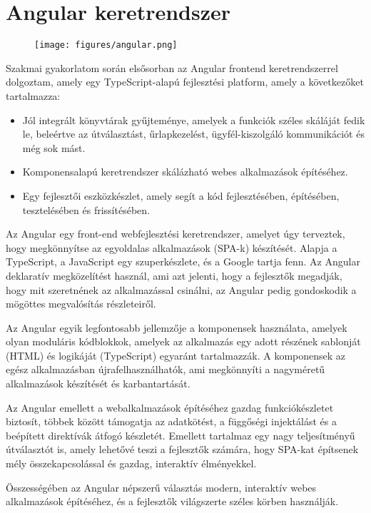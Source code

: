 \section*{Angular keretrendszer}
\begin{figure}[H]
    \centering
    \texttt{[image: figures/angular.png]}
\end{figure}
Szakmai gyakorlatom során elsősorban az Angular frontend keretrendszerrel dolgoztam, amely egy TypeScript-alapú fejlesztési platform, amely a következőket tartalmazza:

\begin{itemize}
    \item Jól integrált könyvtárak gyűjteménye, amelyek a funkciók széles skáláját fedik le, beleértve az útválasztást, űrlapkezelést, ügyfél-kiszolgáló kommunikációt és még sok mást.
    \item Komponensalapú keretrendszer skálázható webes alkalmazások építéséhez.
    \item Egy fejlesztői eszközkészlet, amely segít a kód fejlesztésében, építésében, tesztelésében és frissítésében.
\end{itemize}
\par Az Angular egy front-end webfejlesztési keretrendszer, amelyet úgy terveztek, hogy megkönnyítse az egyoldalas alkalmazások (SPA-k) készítését. Alapja a TypeScript, a JavaScript egy szuperkészlete, és a Google tartja fenn. Az Angular deklaratív megközelítést használ, ami azt jelenti, hogy a fejlesztők megadják, hogy mit szeretnének az alkalmazással csinálni, az Angular pedig gondoskodik a mögöttes megvalósítás részleteiről.
\par Az Angular egyik legfontosabb jellemzője a komponensek használata, amelyek olyan moduláris kódblokkok, amelyek az alkalmazás egy adott részének sablonját (HTML) és logikáját (TypeScript) egyaránt tartalmazzák. A komponensek az egész alkalmazásban újrafelhasználhatók, ami megkönnyíti a nagyméretű alkalmazások készítését és karbantartását.
\par Az Angular emellett a webalkalmazások építéséhez gazdag funkciókészletet biztosít, többek között támogatja az adatkötést, a függőségi injektálást és a beépített direktívák átfogó készletét. Emellett tartalmaz egy nagy teljesítményű útválasztót is, amely lehetővé teszi a fejlesztők számára, hogy SPA-kat építsenek mély összekapcsolással és gazdag, interaktív élményekkel.
\par Összességében az Angular népszerű választás modern, interaktív webes alkalmazások építéséhez, és a fejlesztők világszerte széles körben használják.
